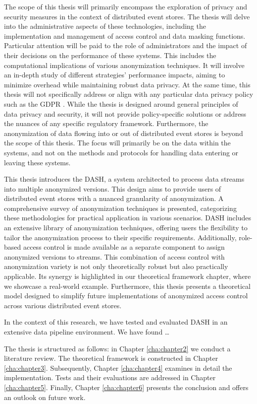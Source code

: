 The scope of this thesis will primarily encompass the exploration of privacy and security measures in the context of distributed event stores. The thesis will delve into the administrative aspects of these technologies, including the implementation and management of access control and data masking functions. Particular attention will be paid to the role of administrators and the impact of their decisions on the performance of these systems. This includes the computational implications of various anonymization techniques. It will involve an in-depth study of different strategies' performance impacts, aiming to minimize overhead while maintaining robust data privacy. At the same time, this thesis will not specifically address or align with any particular data privacy policy such as the \ac{GDPR} \cite{GDPR}. While the thesis is designed around general principles of data privacy and security, it will not provide policy-specific solutions or address the nuances of any specific regulatory framework. Furthermore, the anonymization of data flowing into or out of distributed event stores is beyond the scope of this thesis. The focus will primarily be on the data within the systems, and not on the methods and protocols for handling data entering or leaving these systems. \par
This thesis introduces the \acf{DASH}, a system architected to process data streams into multiple anonymized versions. This design aims to provide users of distributed event stores with a nuanced granularity of anonymization. A comprehensive survey of anonymization techniques is presented, categorizing these methodologies for practical application in various scenarios. \ac{DASH} includes an extensive library of anonymization techniques, offering users the flexibility to tailor the anonymization process to their specific requirements. Additionally, role-based access control is made available as a separate component to assign anonymized versions to streams. This combination of access control with anonymization variety is not only theoretically robust but also practically applicable. Its synergy is highlighted in our theoretical framework chapter, where we showcase a real-world example. Furthermore, this thesis presents a theoretical model designed to simplify future implementations of anonymized access control across various distributed event stores. \par
In the context of this research, we have tested and evaluated \ac{DASH} in an extensive data pipeline environment. We have found \dots \par
The thesis is structured as follows: in Chapter \ref{cha:chapter2} we conduct a literature review. The theoretical framework is constructed in Chapter \ref{cha:chapter3}. Subsequently, Chapter \ref{cha:chapter4} examines in detail the implementation. Tests and their evaluations are addressed in Chapter \ref{cha:chapter5}. Finally, Chapter \ref{cha:chapter6} presents the conclusion and offers an outlook on future work.

